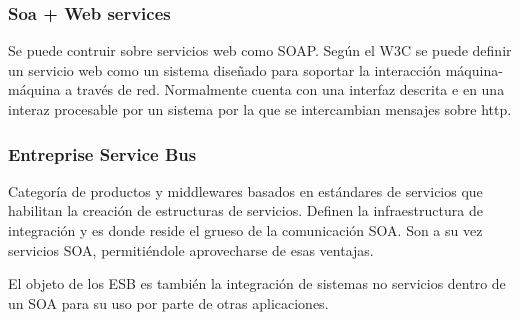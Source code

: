 \subsubsection{Soa + Web services}
Se puede contruir sobre servicios web como SOAP. Según el W3C se puede definir un servicio web como un sistema diseñado para soportar la interacción máquina-máquina a través de red. Normalmente cuenta con una interfaz descrita e en una interaz procesable por un sistema por la que se intercambian mensajes sobre http.

\subsubsection{Entreprise Service Bus}

Categoría de productos y middlewares basados en estándares de servicios que habilitan la creación de estructuras de servicios. Definen la infraestructura de integración y es donde reside el grueso de la comunicación SOA. Son a su vez servicios SOA, permitiéndole aprovecharse de esas ventajas.

El objeto de los ESB es también la integración de sistemas no servicios dentro de un SOA para su uso por parte de otras aplicaciones.